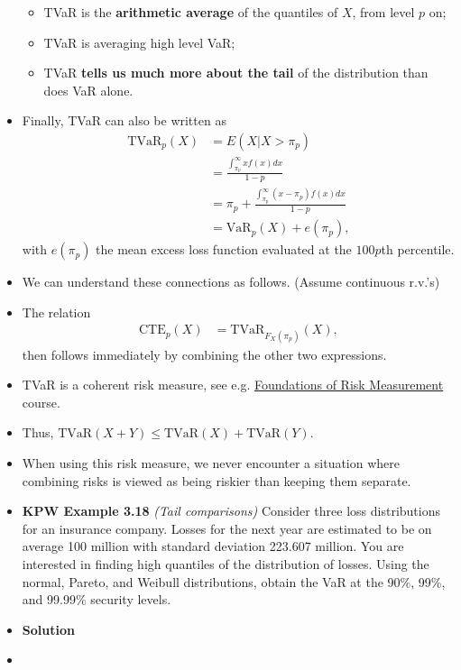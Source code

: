 \documentclass[]{book}
\begin{document}
\begin{itemize}
  \begin{itemize}
  \item
    TVaR is the \textbf{arithmetic average} of the quantiles of \(X\),
    from level \(p\) on;
  \item
    TVaR is averaging high level VaR;
  \item
    TVaR \textbf{tells us much more about the tail} of the distribution
    than does VaR alone.
  \end{itemize}
\item
  Finally, TVaR can also be written as \[\begin{aligned}
  \text{TVaR}_p(X) &= E(X|X>\pi_p) \\
  &= \frac{\int_{\pi_p}^{\infty} x f(x)dx}{1-p} \\
  &= \pi_p + \frac{\int_{\pi_p}^{\infty} (x-\pi_p) f(x) dx}{1-p} \\
  &= \text{VaR}_p(X) + e(\pi_p),\end{aligned}\] with \(e(\pi_p)\) the
  mean excess loss function evaluated at the \(100p\)th percentile.
\item
  We can understand these connections as follows. (Assume continuous
  r.v.'s)
\item
  The relation \[\begin{aligned}
  \text{CTE}_p(X) &= \text{TVaR}_{F_X(\pi_p)}(X),\end{aligned}\] then
  follows immediately by combining the other two expressions.
\item
  TVaR is a coherent risk measure, see e.g.
  \href{http://onderwijsaanbod.kuleuven.be/syllabi/e/D0R57BE.htm\#activetab=doelstellingen_idp1406608}{Foundations
  of Risk Measurement} course.
\item
  Thus, \(\text{TVaR}(X+Y) \leq \text{TVaR}(X)+\text{TVaR}(Y)\).
\item
  When using this risk measure, we never encounter a situation where
  combining risks is viewed as being riskier than keeping them separate.
\item
  \textbf{KPW Example 3.18} \emph{(Tail comparisons)} Consider three
  loss distributions for an insurance company. Losses for the next year
  are estimated to be on average 100 million with standard deviation
  223.607 million. You are interested in finding high quantiles of the
  distribution of losses. Using the normal, Pareto, and Weibull
  distributions, obtain the VaR at the 90\%, 99\%, and 99.99\% security
  levels.
\item
  \textbf{Solution}
\item

\end{itemize}
\end{document}
